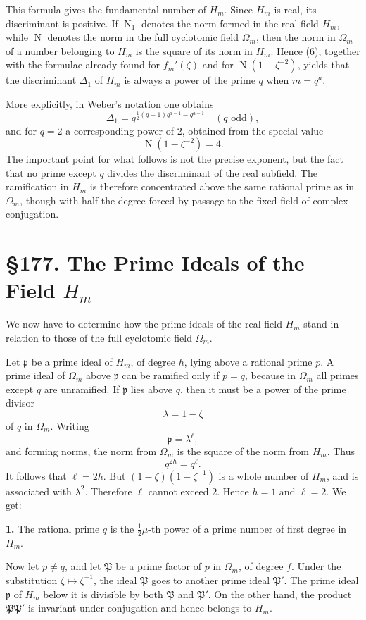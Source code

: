 \documentclass[12pt,a4paper]{article}
\newcommand{\webersection}[2]{\clearpage\section*{\S #1. #2}}
\newcommand{\Om}{\Omega_m}
\newcommand{\Hm}{H_m}
\newcommand{\zetaS}{\zeta}
\newcommand{\idealp}{\mathfrak p}
\newcommand{\N}{\operatorname{N}}
\begin{document}
This formula gives the fundamental number of \(\Hm\).  Since \(\Hm\) is real, its discriminant is positive.  If \(\N_1\) denotes the norm formed in the real field \(\Hm\), while \(\N\) denotes the norm in the full cyclotomic field \(\Om\), then the norm in \(\Om\) of a number belonging to \(\Hm\) is the square of its norm in \(\Hm\).  Hence (6), together with the formulae already found for \(f_m'(\zetaS)\) and for \(\N(1-\zetaS^{-2})\), yields that the discriminant \(\Delta_1\) of \(\Hm\) is always a power of the prime \(q\) when \(m=q^a\).

More explicitly, in Weber's notation one obtains
\[
  \Delta_1=q^{\frac12(q-1)q^{a-1}-q^{a-1}}
  \quad(q\text{ odd}),
\tag{7a}
\]
and for \(q=2\) a corresponding power of \(2\), obtained from the special value
\[
  \N(1-\zetaS^{-2})=4.
\tag{7b}
\]
The important point for what follows is not the precise exponent, but the fact that no prime except \(q\) divides the discriminant of the real subfield.  The ramification in \(\Hm\) is therefore concentrated above the same rational prime as in \(\Om\), though with half the degree forced by passage to the fixed field of complex conjugation.

\webersection{177}{The Prime Ideals of the Field \(\Hm\)}

We now have to determine how the prime ideals of the real field \(\Hm\) stand in relation to those of the full cyclotomic field \(\Om\).

Let \(\idealp\) be a prime ideal of \(\Hm\), of degree \(h\), lying above a rational prime \(p\).  A prime ideal of \(\Om\) above \(\idealp\) can be ramified only if \(p=q\), because in \(\Om\) all primes except \(q\) are unramified.  If \(\idealp\) lies above \(q\), then it must be a power of the prime divisor
\[
  \lambda=1-\zetaS
\]
of \(q\) in \(\Om\).  Writing
\[
  \idealp=\lambda^\ell,
\]
and forming norms, the norm from \(\Om\) is the square of the norm from \(\Hm\).  Thus
\[
  q^{2h}=q^\ell.
\]
It follows that \(\ell=2h\).  But \((1-\zetaS)(1-\zetaS^{-1})\) is a whole number of \(\Hm\), and is associated with \(\lambda^2\).  Therefore \(\ell\) cannot exceed \(2\).  Hence \(h=1\) and \(\ell=2\).  We get:

\textbf{1.} The rational prime \(q\) is the \(\frac12\mu\)-th power of a prime number of first degree in \(\Hm\).

Now let \(p\ne q\), and let \(\mathfrak P\) be a prime factor of \(p\) in \(\Om\), of degree \(f\).  Under the substitution \(\zetaS\mapsto\zetaS^{-1}\), the ideal \(\mathfrak P\) goes to another prime ideal \(\mathfrak P'\).  The prime ideal \(\idealp\) of \(\Hm\) below it is divisible by both \(\mathfrak P\) and \(\mathfrak P'\).  On the other hand, the product \(\mathfrak P\mathfrak P'\) is invariant under conjugation and hence belongs to \(\Hm\).
\end{document}
